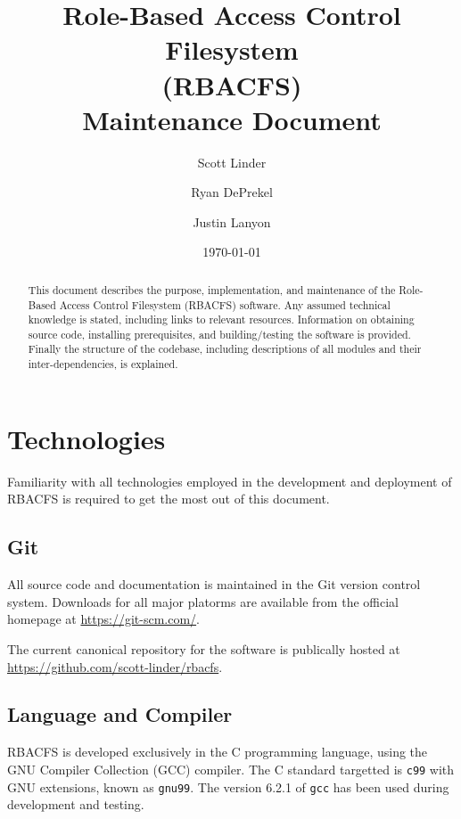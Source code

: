 \documentclass[11pt,oneside,letterpaper]{article}
\begin{document}
\title{
    Role-Based Access Control Filesystem\\
    (RBACFS) \\
    Maintenance Document
}
\author{
    Scott Linder\\
    \and
    Ryan DePrekel\\
    \and
    Justin Lanyon
}
\date{\today}

\maketitle

\begin{abstract}
This document describes the purpose, implementation, and maintenance of the
Role-Based Access Control Filesystem (RBACFS) software. Any assumed technical
knowledge is stated, including links to relevant resources. Information on
obtaining source code, installing prerequisites, and building/testing the
software is provided. Finally the structure of the codebase, including
descriptions of all modules and their inter-dependencies, is explained.
\end{abstract}

\section{Technologies}

Familiarity with all technologies employed in the development and deployment of
RBACFS is required to get the most out of this document.

\subsection{Git}

All source code and documentation is maintained in the Git version control
system. Downloads for all major platorms are available from the official
homepage at \url{https://git-scm.com/}.

The current canonical repository for the software is publically hosted at
\url{https://github.com/scott-linder/rbacfs}.

\subsection{Language and Compiler}

RBACFS is developed exclusively in the C programming language, using the GNU
Compiler Collection (GCC) compiler. The C standard targetted is {\tt c99} with
GNU extensions, known as {\tt gnu99}. The version 6.2.1 of {\tt gcc} has been
used during development and testing.
\end{document}
